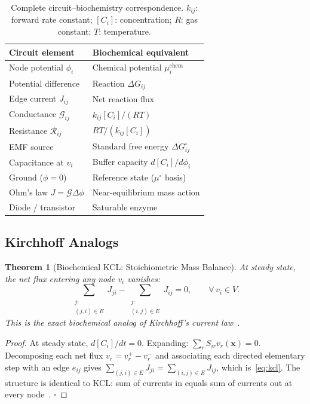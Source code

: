 \documentclass[twocolumn,10pt,a4paper]{article}
\newcommand{\Gcond}{\mathcal{G}}
\newtheorem{theorem}{Theorem}[section]
\begin{document}
\begin{table}[t]
\caption{Complete circuit--biochemistry correspondence.  $k_{ij}$: forward
rate constant; $[C_i]$: concentration; $R$: gas constant; $T$: temperature.}
\label{tab:analogy}
\small
\begin{tabular}{@{}lp{3.9cm}@{}}
\toprule
\textbf{Circuit element} & \textbf{Biochemical equivalent} \\
\midrule
Node potential $\phi_i$      & Chemical potential $\mu_i^{\mathrm{chem}}$ \\
Potential difference         & Reaction $\Delta G_{ij}$ \\
Edge current $J_{ij}$        & Net reaction flux \\
Conductance $\Gcond_{ij}$    & $k_{ij}[C_i]/(RT)$ \\
Resistance $\mathcal{R}_{ij}$& $RT/(k_{ij}[C_i])$ \\
EMF source                   & Standard free energy $\Delta G^\circ_{ij}$ \\
Capacitance at $v_i$         & Buffer capacity $d[C_i]/d\phi_i$ \\
Ground ($\phi=0$)             & Reference state ($\mu^\circ$ basis) \\
Ohm's law $J=\Gcond\Delta\phi$ & Near-equilibrium mass action \\
Diode / transistor           & Saturable enzyme \\
\bottomrule
\end{tabular}
\end{table}

\subsection{Kirchhoff Analogs}
\label{sec:circuit-kirchhoff}

\begin{theorem}[Biochemical KCL: Stoichiometric Mass Balance]
\label{thm:kcl}
At steady state, the net flux entering any node $v_i$ vanishes:
\begin{equation}
  \sum_{\substack{j:\\(j,i)\in E}} J_{ji}
  - \sum_{\substack{j:\\(i,j)\in E}} J_{ij} = 0,
  \qquad \forall\,v_i\in V.
  \label{eq:kcl}
\end{equation}
This is the exact biochemical analog of Kirchhoff's current
law~\cite{Kirchhoff1845}.
\end{theorem}

\begin{proof}
At steady state, $d[C_i]/dt=0$.  Expanding:
$\sum_r S_{ir}v_r(\mathbf{x})=0$.
Decomposing each net flux $v_r=v_r^+-v_r^-$ and associating each directed
elementary step with an edge $e_{ij}$ gives
$\sum_{(j,i)\in E}J_{ji}=\sum_{(i,j)\in E}J_{ij}$,
which is~\eqref{eq:kcl}.  The structure is identical to KCL:
sum of currents in equals sum of currents out at every node~\cite{Kirchhoff1845}.
$\square$
\end{proof}
\end{document}
